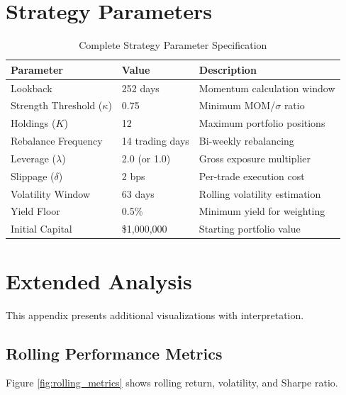 \documentclass[12pt,a4paper]{article}
\theoremstyle{definition}
\begin{document}

\newpage
\appendix

\section{Strategy Parameters}
\label{app:parameters}

\begin{table}[H]
\centering
\caption{Complete Strategy Parameter Specification}
\label{tab:parameters}
\begin{tabular}{llp{7cm}}
\toprule
\textbf{Parameter} & \textbf{Value} & \textbf{Description} \\
\midrule
Lookback & 252 days & Momentum calculation window \\
Strength Threshold ($\kappa$) & 0.75 & Minimum MOM/$\sigma$ ratio \\
Holdings ($K$) & 12 & Maximum portfolio positions \\
Rebalance Frequency & 14 trading days & Bi-weekly rebalancing \\
Leverage ($\lambda$) & 2.0 (or 1.0) & Gross exposure multiplier \\
Slippage ($\delta$) & 2 bps & Per-trade execution cost \\
Volatility Window & 63 days & Rolling volatility estimation \\
Yield Floor & 0.5\% & Minimum yield for weighting \\
Initial Capital & \$1,000,000 & Starting portfolio value \\
\bottomrule
\end{tabular}
\end{table}

\section{Extended Analysis}

This appendix presents additional visualizations with interpretation.

\subsection{Rolling Performance Metrics}

Figure \ref{fig:rolling_metrics} shows rolling return, volatility, and Sharpe ratio.
\end{document}
